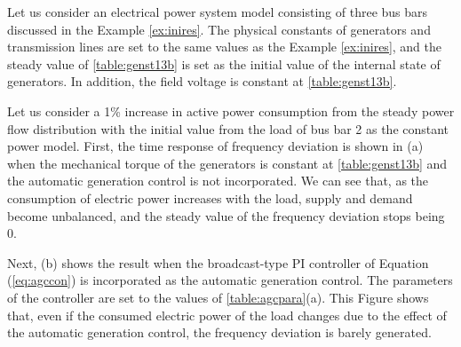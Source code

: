 \documentclass[tombow,dvipdfmx]{corona-a5-1.1}
\begin{document}
\begin{例}\label{ex:agcdemo}
Let us consider an electrical power system model consisting of three bus bars discussed in the Example \ref{ex:inires}.
The physical constants of generators and transmission lines are set to the same values as the Example \ref{ex:inires}, and the steady value of \ref{table:genst13b} is set as the initial value of the internal state of generators.
In addition, the field voltage is constant at \ref{table:genst13b}.

Let us consider a 1\% increase in active power consumption from the steady power flow distribution with the initial value from the load of bus bar 2 as the constant power model.
First, the time response of frequency deviation is shown in (a) when the mechanical torque of the generators is constant at \ref{table:genst13b} and the automatic generation control is not incorporated.
We can see that, as the consumption of electric power increases with the load, supply and demand become unbalanced, and the steady value of the frequency deviation stops being 0.

Next, (b) shows the result when the broadcast-type PI controller of Equation (\ref{eq:agccon}) is incorporated as the automatic generation control.
The parameters of the controller are set to the values of \ref{table:agcpara}(a).
This Figure shows that, even if the consumed electric power of the load changes due to the effect of the automatic generation control, the frequency deviation is barely generated.
\end{例}
\end{document}
